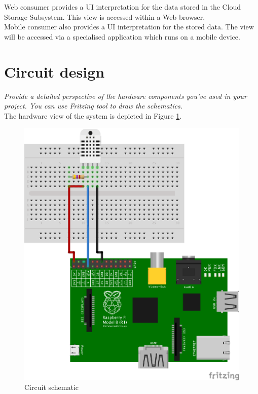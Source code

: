 \documentclass[a4paper,11pt]{article}
\begin{document}
Web consumer provides a UI interpretation for the data stored in the Cloud Storage Subsystem. This view is accessed within a Web browser.\\

Mobile consumer also provides a UI interpretation for the stored data. The view will be accessed via a specialised application which runs on a mobile device.

\section{Circuit design}
\textit{Provide a detailed perspective of the hardware components you’ve used in your project. You can use Fritzing tool to draw the schematics.}\\

The hardware view of the system is depicted in Figure \ref{fig:circuit-design}.

\begin{figure}[h]
\centering
\includegraphics[scale=0.7]{circuit-design.png}
\caption{Circuit schematic}
\label{fig:circuit-design}
\end{figure}
\end{document}
